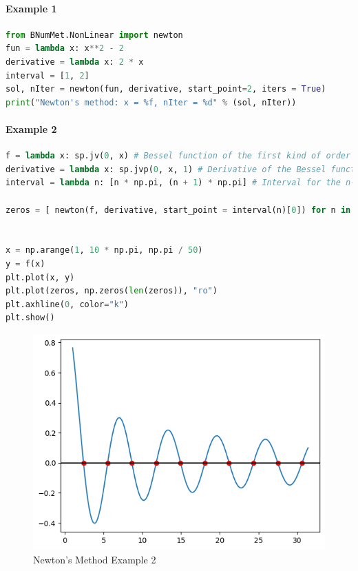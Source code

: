 \paragraph{Example 1}{
\begin{lstlisting}[language=Python]
from BNumMet.NonLinear import newton
fun = lambda x: x**2 - 2
derivative = lambda x: 2 * x
interval = [1, 2]
sol, nIter = newton(fun, derivative, start_point=2, iters = True)
print("Newton's method: x = %f, nIter = %d" % (sol, nIter))
\end{lstlisting}
}
\paragraph{Example 2}{
\begin{lstlisting}[language=Python]
f = lambda x: sp.jv(0, x) # Bessel function of the first kind of order 0
derivative = lambda x: sp.jvp(0, x, 1) # Derivative of the Bessel function
interval = lambda n: [n * np.pi, (n + 1) * np.pi] # Interval for the n-th zero

zeros = [ newton(f, derivative, start_point = interval(n)[0]) for n in range(1, 11)]


x = np.arange(1, 10 * np.pi, np.pi / 50)
y = f(x)
plt.plot(x, y)
plt.plot(zeros, np.zeros(len(zeros)), "ro")
plt.axhline(0, color="k")
plt.show()
\end{lstlisting}
}
\begin{figure}[H]
    \centering
    \includegraphics{Include/Images/Thesis/Documentation/NonLinear/Newtons Example 2.png}
    \caption{Newton's Method Example 2}
    \label{fig:Newton's Method Example 2}
\end{figure}